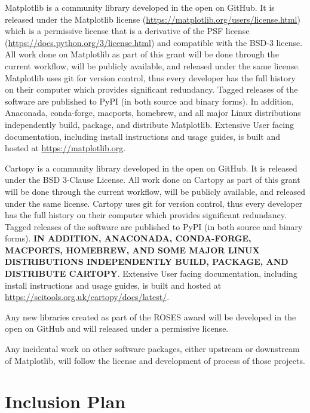 \documentclass[12pt]{article}
\numberwithin{page}{section}
\begin{document}
Matplotlib is a community library developed in the open on GitHub.
It is released under the Matplotlib license
(\url{https://matplotlib.org/users/license.html}) which is a permissive
license that is a derivative of the PSF license
(\url{https://docs.python.org/3/license.html}) and compatible with the
BSD-3 license.  All work done on Matplotlib as part of this grant will
be done through the current workflow, will be publicly available, and
released under the same license.  Matplotlib uses git for version
control, thus every developer has the full history on their computer
which provides significant redundancy.  Tagged releases of the
software are published to PyPI (in both source and binary forms).  In
addition, Anaconada, conda-forge, macports, homebrew, and all major Linux
distributions independently build, package, and distribute Matplotlib.
Extensive User facing documentation, including install instructions
and usage guides, is built and hosted at \url{https://matplotlib.org}.

Cartopy is a community library developed in the open on GitHub.  It is released
under the BSD 3-Clause License.  All work done on Cartopy as part of this grant
will be done through the current workflow, will be publicly available, and
released under the same license.  Cartopy uses git for version control, thus
every developer has the full history on their computer which provides
significant redundancy.  Tagged releases of the software are published to PyPI
(in both source and binary forms).
\textbf{IN ADDITION, ANACONADA, CONDA-FORGE, MACPORTS, HOMEBREW, AND SOME MAJOR
  LINUX DISTRIBUTIONS INDEPENDENTLY BUILD, PACKAGE, AND DISTRIBUTE CARTOPY}.
Extensive User facing documentation, including install instructions and usage
guides, is built and hosted at
\url{https://scitools.org.uk/cartopy/docs/latest/}.

Any new libraries created as part of the ROSES award will be developed
in the open on GitHub and will released under a permissive license.

Any incidental work on other software packages, either upstream or
downstream of Matplotlib, will follow the license and development of
process of those projects.

\newpage

\section{Inclusion Plan}
\setcounter{page}{1}
\end{document}
